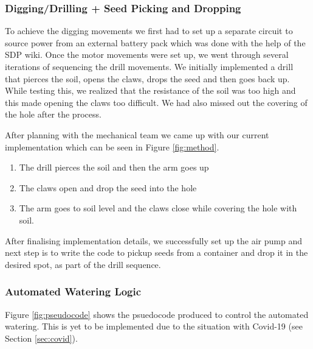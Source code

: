 \documentclass{article}
\begin{document}
\subsubsection{Digging/Drilling + Seed Picking and Dropping}

To achieve the digging movements we first had to set up a separate circuit to source power from an external battery pack which was done with the help of the SDP wiki. Once the motor movements were set up, we went through several iterations of sequencing the drill movements. We initially implemented a drill that pierces the soil, opens the claws, drops the seed and then goes back up. While testing this, we realized that the resistance of the soil was too high and this made opening the claws too difficult. We had also missed out the covering of the hole after the process.

After planning with the mechanical team we came up with our current implementation which can be seen in Figure \ref{fig:method}.

\begin{enumerate}
    \vspace{-3mm}
    \item The drill pierces the soil and then the arm goes up
    \item The claws open and drop the seed into the hole
    \item The arm goes to soil level and the claws close while covering the hole with soil.
    \vspace{-3mm}
\end{enumerate}

After finalising implementation details, we successfully set up the air pump and next step is to write the code to pickup seeds from a container and drop it in the desired spot, as part of the drill sequence.


\subsubsection{Automated Watering Logic}

Figure \ref{fig:pseudocode} shows the psuedocode produced to control the automated watering. This is yet to be implemented due to the situation with Covid-19 (see Section \ref{sec:covid}).
\end{document}
